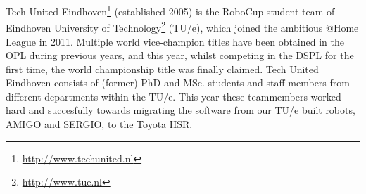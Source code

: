 Tech United Eindhoven\footnote{\url{http://www.techunited.nl}} (established 2005) is the RoboCup student team of Eindhoven University of Technology\footnote{\url{http://www.tue.nl}} (TU/e), which joined the ambitious @Home League in 2011. 
Multiple world vice-champion titles have been obtained in the OPL during previous years, and this year, whilst competing in the DSPL for the first time, the world championship title was finally claimed.
Tech United Eindhoven consists of (former) PhD and MSc. students and staff members from different departments within the TU/e. 
This year these teammembers worked hard and succesfully towards migrating the software from our TU/e built robots, AMIGO and SERGIO, to the Toyota HSR. 
 


